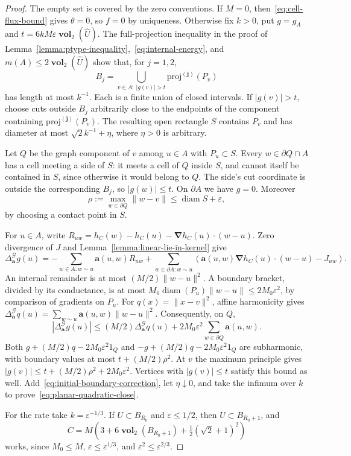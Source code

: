 \documentclass[12pt]{amsart}
\numberwithin{equation}{section}
\DeclareMathOperator{\diam}{{\mathop{diam}}}
\newcommand{\eps}{\varepsilon}
\newcommand{\Cnabla}{\boldsymbol{\nabla}}
\newcommand{\projj}{\boldsymbol{\mathrm{proj}^{(j)}}}
\newcommand{\aDelta}{\hyperref[eq:geometric-laplacian]{{\Delta^{\mathcal{G}}_{\cond}}}}
\newcommand{\cond}{\hyperref[eq:geometric-laplacian]{\mathbf{a}}}
\DeclareMathOperator{\vol}{\mathbf{vol}}
\begin{document}
\begin{proof}
The empty set is covered by the zero conventions. If $M=0$, then~\eqref{eq:cell-flux-bound} gives $\theta=0$, so $f=0$ by uniqueness. Otherwise fix $k>0$, put $g=g_A$ and $t=6kM\eps\vol_2(\widehat U)$. The full-projection inequality in the proof of Lemma~\ref{lemma:ptype-inequality},~\eqref{eq:internal-energy}, and $m(A)\le2\vol_2(\widehat U)$ show that, for $j=1,2$,
\[
 B_j=\bigcup_{v\in A:\ |g(v)|>t}\projj(P_v)
\]
has length at most $k^{-1}$. Each is a finite union of closed intervals. If $|g(v)|>t$, choose cuts outside $B_j$ arbitrarily close to the endpoints of the component containing $\projj(P_v)$. The resulting open rectangle $S$ contains $P_v$ and has diameter at most $\sqrt2 k^{-1}+\eta$, where $\eta>0$ is arbitrary.

Let $Q$ be the graph component of $v$ among $u\in A$ with $P_u\subset S$. Every $w\in\partial Q\cap A$ has a cell meeting a side of $S$: it meets a cell of $Q$ inside $S$, and cannot itself be contained in $S$, since otherwise it would belong to $Q$. The side's cut coordinate is outside the corresponding $B_j$, so $|g(w)|\le t$. On $\partial A$ we have $g=0$. Moreover
\[
 \rho:=\max_{w\in\partial Q}\|w-v\|\le\diam S+\eps,
\]
by choosing a contact point in $S$.

For $u\in A$, write $R_{uw}=h_C(w)-h_C(u)-\Cnabla h_C(u)\cdot(w-u)$. Zero divergence of $J$ and Lemma~\ref{lemma:linear-lie-in-kernel} give
\[
 \aDelta g(u)=-\sum_{w\in A:w\sim u}\cond(u,w)R_{uw}
 +\sum_{w\in\partial A:w\sim u}
 \left(\cond(u,w)\Cnabla h_C(u)\cdot(w-u)-J_{uw}\right).
\]
An internal remainder is at most $(M/2)\|w-u\|^2$. A boundary bracket, divided by its conductance, is at most $M_0\diam(P_u)\|w-u\|\le2M_0\eps^2$, by comparison of gradients on $P_u$. For $q(x)=\|x-v\|^2$, affine harmonicity gives $\aDelta q(u)=\sum_{w\sim u}\cond(u,w)\|w-u\|^2$. Consequently, on $Q$,
\[
 |\aDelta g(u)|\le(M/2)\aDelta q(u)+2M_0\eps^2
                  \sum_{w\in\partial Q}\cond(u,w).
\]
Both $g+(M/2)q-2M_0\eps^2 1_Q$ and $-g+(M/2)q-2M_0\eps^2 1_Q$ are subharmonic, with boundary values at most $t+(M/2)\rho^2$. At $v$ the maximum principle gives
$|g(v)|\le t+(M/2)\rho^2+2M_0\eps^2$. Vertices with $|g(v)|\le t$ satisfy this bound as well. Add~\eqref{eq:initial-boundary-correction}, let $\eta\downarrow0$, and take the infimum over $k$ to prove~\eqref{eq:planar-quadratic-close}.

For the rate take $k=\eps^{-1/3}$. If $U\subset B_{R_0}$ and $\eps\le1/2$, then $\widehat U\subset B_{R_0+1}$, and
\[
 C=M\left(3+6\vol_2(B_{R_0+1})+\tfrac12(\sqrt2+1)^2\right)
\]
works, since $M_0\le M$, $\eps\le\eps^{1/3}$, and $\eps^2\le\eps^{2/3}$.
\end{proof}
\end{document}
